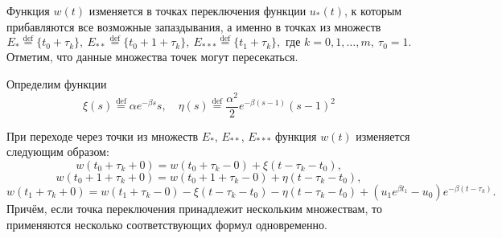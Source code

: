 Функция $w(t)$ изменяется в точках переключения функции $u_*(t)$, к которым прибавляются все возможные запаздывания, а именно в точках из множеств
%
\[E_*\stackrel{\text{def}}{=}\{t_0 + \tau_k\},\ E_{**}\stackrel{\text{def}}{=}\{t_0 + 1 + \tau_k\},\ E_{***}\stackrel{\text{def}}{=}\{t_1 + \tau_k\},\text{ где }k=0,1,\ldots,m,\ \tau_0=1.\]
%
Отметим, что данные множества точек могут пересекаться.

Определим функции 
$$\xi(s)\stackrel{\text{def}}{=}\alpha e^{-\beta s} s ,\quad \eta(s)\stackrel{\text{def}}{=}\frac{\alpha^2}{2} e^{-\beta( s-1)} (s-1)^2$$
\begin{lemma}
	\label{lm:lem_w_*}
	При переходе через точки из множеств $E_*$, $E_{**}$, $E_{***}$ функция $w(t)$ изменяется следующим образом:
	\begin{equation}
		\label{eq:w_*}
		w(t_0 + \tau_k+0) = w(t_0 + \tau_k-0) +  \xi(t-\tau_k-t_0),
	\end{equation}
	\begin{equation}
		\label{eq:w_**}
		w(t_0 +1+ \tau_k+0) = w(t_0 +1+ \tau_k-0) +\eta(t-\tau_k-t_0), 
	\end{equation}
	\begin{equation}
		\label{eq:w_***} 
		w(t_1 + \tau_k+0) = w(t_1 + \tau_k-0)-\xi(t-\tau_k-t_0)-\eta(t-\tau_k-t_0)+
		(u_1 e^{\beta t_1}-u_0)e^{-\beta(t-\tau_k)}.
	\end{equation}
	Причём, если точка переключения принадлежит нескольким множествам, то применяются несколько  соответствующих формул одновременно.
\end{lemma}

